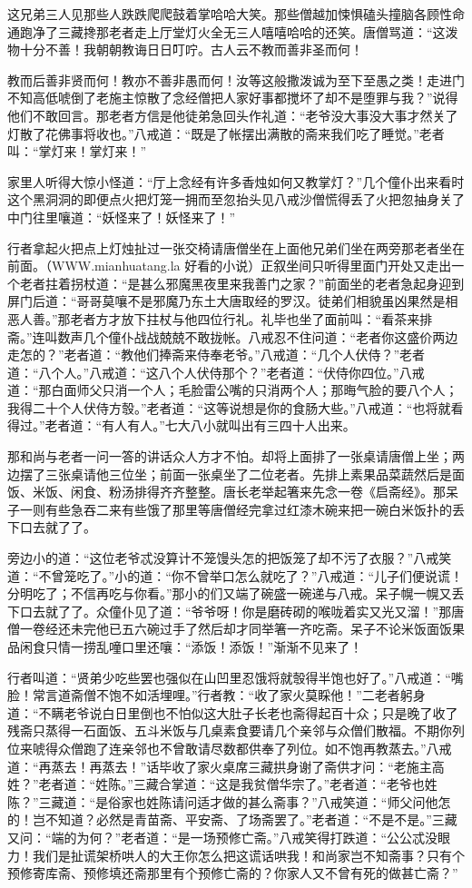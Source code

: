 \documentclass[12pt,UTF8]{ctexbook}
\begin{document}
这兄弟三人见那些人跌跌爬爬鼓着掌哈哈大笑。那些僧越加悚惧磕头撞脑各顾性命通跑净了三藏搀那老者走上厅堂灯火全无三人嘻嘻哈哈的还笑。唐僧骂道：“这泼物十分不善！我朝朝教诲日日叮咛。古人云不教而善非圣而何！

教而后善非贤而何！教亦不善非愚而何！汝等这般撒泼诚为至下至愚之类！走进门不知高低唬倒了老施主惊散了念经僧把人家好事都搅坏了却不是堕罪与我？”说得他们不敢回言。那老者方信是他徒弟急回头作礼道：“老爷没大事没大事才然关了灯散了花佛事将收也。”八戒道：“既是了帐摆出满散的斋来我们吃了睡觉。”老者叫：“掌灯来！掌灯来！”

家里人听得大惊小怪道：“厅上念经有许多香烛如何又教掌灯？”几个僮仆出来看时这个黑洞洞的即便点火把灯笼一拥而至忽抬头见八戒沙僧慌得丢了火把忽抽身关了中门往里嚷道：“妖怪来了！妖怪来了！”

行者拿起火把点上灯烛扯过一张交椅请唐僧坐在上面他兄弟们坐在两旁那老者坐在前面。（WWW.mianhuatang.la 好看的小说）正叙坐间只听得里面门开处又走出一个老者拄着拐杖道：“是甚么邪魔黑夜里来我善门之家？”前面坐的老者急起身迎到屏门后道：“哥哥莫嚷不是邪魔乃东土大唐取经的罗汉。徒弟们相貌虽凶果然是相恶人善。”那老者方才放下拄杖与他四位行礼。礼毕也坐了面前叫：“看茶来排斋。”连叫数声几个僮仆战战兢兢不敢拢帐。八戒忍不住问道：“老者你这盛价两边走怎的？”老者道：“教他们捧斋来侍奉老爷。”八戒道：“几个人伏侍？”老者道：“八个人。”八戒道：“这八个人伏侍那个？”老者道：“伏侍你四位。”八戒道：“那白面师父只消一个人；毛脸雷公嘴的只消两个人；那晦气脸的要八个人；我得二十个人伏侍方彀。”老者道：“这等说想是你的食肠大些。”八戒道：“也将就看得过。”老者道：“有人有人。”七大八小就叫出有三四十人出来。

那和尚与老者一问一答的讲话众人方才不怕。却将上面排了一张桌请唐僧上坐；两边摆了三张桌请他三位坐；前面一张桌坐了二位老者。先排上素果品菜蔬然后是面饭、米饭、闲食、粉汤排得齐齐整整。唐长老举起箸来先念一卷《启斋经》。那呆子一则有些急吞二来有些饿了那里等唐僧经完拿过红漆木碗来把一碗白米饭扑的丢下口去就了了。

旁边小的道：“这位老爷忒没算计不笼馒头怎的把饭笼了却不污了衣服？”八戒笑道：“不曾笼吃了。”小的道：“你不曾举口怎么就吃了？”八戒道：“儿子们便说谎！分明吃了；不信再吃与你看。”那小的们又端了碗盛一碗递与八戒。呆子幌一幌又丢下口去就了了。众僮仆见了道：“爷爷呀！你是磨砖砌的喉咙着实又光又溜！”那唐僧一卷经还未完他已五六碗过手了然后却才同举箸一齐吃斋。呆子不论米饭面饭果品闲食只情一捞乱噇口里还嚷：“添饭！添饭！”渐渐不见来了！

行者叫道：“贤弟少吃些罢也强似在山凹里忍饿将就彀得半饱也好了。”八戒道：“嘴脸！常言道斋僧不饱不如活埋哩。”行者教：“收了家火莫睬他！”二老者躬身道：“不瞒老爷说白日里倒也不怕似这大肚子长老也斋得起百十众；只是晚了收了残斋只蒸得一石面饭、五斗米饭与几桌素食要请几个亲邻与众僧们散福。不期你列位来唬得众僧跑了连亲邻也不曾敢请尽数都供奉了列位。如不饱再教蒸去。”八戒道：“再蒸去！再蒸去！”话毕收了家火桌席三藏拱身谢了斋供才问：“老施主高姓？”老者道：“姓陈。”三藏合掌道：“这是我贫僧华宗了。”老者道：“老爷也姓陈？”三藏道：“是俗家也姓陈请问适才做的甚么斋事？”八戒笑道：“师父问他怎的！岂不知道？必然是青苗斋、平安斋、了场斋罢了。”老者道：“不是不是。”三藏又问：“端的为何？”老者道：“是一场预修亡斋。”八戒笑得打跌道：“公公忒没眼力！我们是扯谎架桥哄人的大王你怎么把这谎话哄我！和尚家岂不知斋事？只有个预修寄库斋、预修填还斋那里有个预修亡斋的？你家人又不曾有死的做甚亡斋？”
\end{document}
